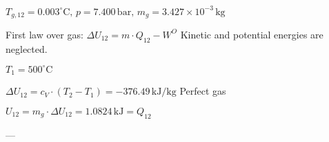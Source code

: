 \( T_{g,12} = 0.003^\circ \text{C}, \, p = 7.400 \, \text{bar}, \, m_g = 3.427 \times 10^{-3} \, \text{kg} \)  

First law over gas:  
\( \Delta U_{12} = m \cdot Q_{12} - W^O \)  
Kinetic and potential energies are neglected.  

\( T_1 = 500^\circ \text{C} \)  

\( \Delta U_{12} = c_V \cdot (T_2 - T_1) = -376.49 \, \text{kJ/kg} \)  
Perfect gas  

\( U_{12} = m_g \cdot \Delta U_{12} = 1.0824 \, \text{kJ} = Q_{12} \)  

---